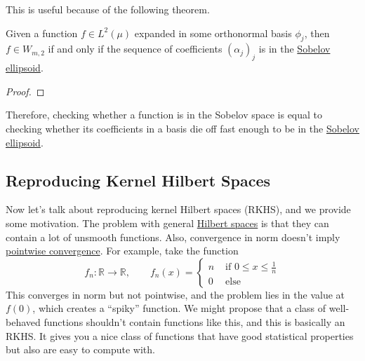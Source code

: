   This is useful because of the following theorem. 
  
  \begin{theorem}
    \label{thm:conditions-for-function-being-in-sobelov-space}
    Given a function $f \in L^2(\mu)$ expanded in some orthonormal basis $\phi_j$, then $f \in W_{m, 2}$ if and only if the sequence of coefficients $(\alpha_j)_j$ is in the \hyperref[def:sobelov-ellipsoid]{Sobelov ellipsoid}. 
  \end{theorem}
  \begin{proof}
    
  \end{proof}

  Therefore, checking whether a function is in the Sobelov space is equal to checking whether its coefficients in a basis die off fast enough to be in the \hyperref[def:sobelov-ellipsoid]{Sobelov ellipsoid}. 

\subsection{Reproducing Kernel Hilbert Spaces}

  Now let's talk about reproducing kernel Hilbert spaces (RKHS), and we provide some motivation. The problem with general \hyperref[fa-def:hilbert-space]{Hilbert spaces} is that they can contain a lot of unsmooth functions. Also, convergence in norm doesn't imply \hyperref[real-def:pointwise-convergence]{pointwise convergence}. For example, take the function 
  \begin{equation}
    f_n: \mathbb{R} \to \mathbb{R}, \qquad f_n (x) = \begin{cases}
      n & \text{ if } 0 \leq x \leq \frac{1}{n} \\ 
      0 & \text{ else }
    \end{cases}
  \end{equation}
  This converges in norm but not pointwise, and the problem lies in the value at $f(0)$, which creates a ``spiky'' function. We might propose that a class of well-behaved functions shouldn't contain functions like this, and this is basically an RKHS. It gives you a nice class of functions that have good statistical properties but also are easy to compute with. 

